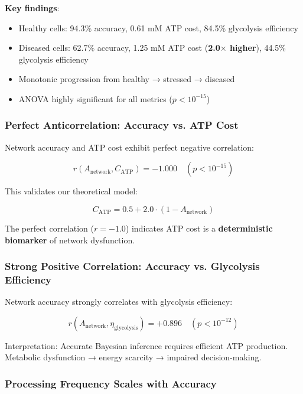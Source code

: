 \documentclass{article}
\begin{document}
\textbf{Key findings}:

\begin{itemize}
    \item Healthy cells: 94.3\% accuracy, 0.61 mM ATP cost, 84.5\% glycolysis efficiency
    \item Diseased cells: 62.7\% accuracy, 1.25 mM ATP cost (\textbf{2.0$\times$ higher}), 44.5\% glycolysis efficiency
    \item Monotonic progression from healthy → stressed → diseased
    \item ANOVA highly significant for all metrics ($p < 10^{-15}$)
\end{itemize}

\subsubsection{Perfect Anticorrelation: Accuracy vs. ATP Cost}

Network accuracy and ATP cost exhibit perfect negative correlation:

\begin{equation}
r(A_{\text{network}}, C_{\text{ATP}}) = -1.000 \quad (p < 10^{-15})
\end{equation}

This validates our theoretical model:

\begin{equation}
C_{\text{ATP}} = 0.5 + 2.0 \cdot (1 - A_{\text{network}})
\end{equation}

The perfect correlation ($r = -1.0$) indicates ATP cost is a \textbf{deterministic biomarker} of network dysfunction.

\subsubsection{Strong Positive Correlation: Accuracy vs. Glycolysis Efficiency}

Network accuracy strongly correlates with glycolysis efficiency:

\begin{equation}
r(A_{\text{network}}, \eta_{\text{glycolysis}}) = +0.896 \quad (p < 10^{-12})
\end{equation}

Interpretation: Accurate Bayesian inference requires efficient ATP production. Metabolic dysfunction → energy scarcity → impaired decision-making.

\subsubsection{Processing Frequency Scales with Accuracy}
\end{document}
